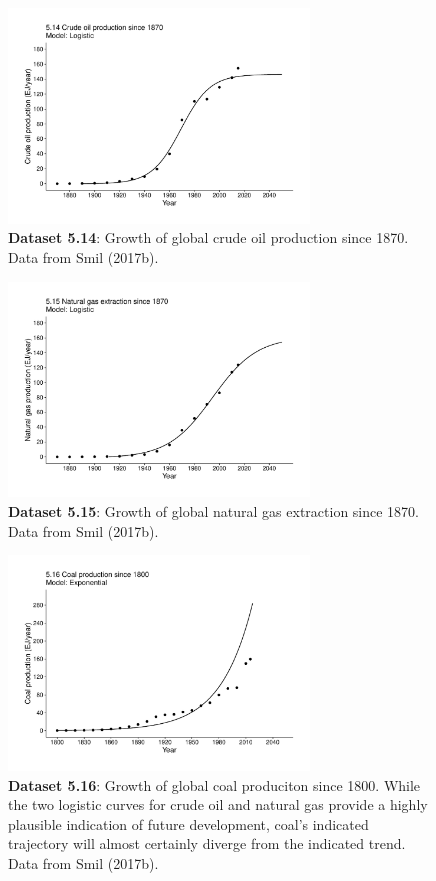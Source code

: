 \documentclass[aps,rmp,preprint,superscriptaddress,10pt,onecolumn]{article}
\begin{document}
\begin{figure}[h]
\includegraphics[width=8cm]{output/figs-ggplot/5.14.pdf}
\caption{\textbf{Dataset 5.14}: Growth of global crude oil production since 1870. Data from Smil (2017b).}
\end{figure}
	
\begin{figure}[h]
\includegraphics[width=8cm]{output/figs-ggplot/5.15.pdf}
\caption{\textbf{Dataset 5.15}: Growth of global natural gas extraction since 1870. Data from Smil (2017b).}
\end{figure}
	
\begin{figure}[h]
\includegraphics[width=8cm]{output/figs-ggplot/5.16.pdf}
\caption{\textbf{Dataset 5.16}: Growth of global coal produciton since 1800. While the two logistic curves for crude oil and natural gas provide a highly plausible indication of future development, coal's indicated trajectory will almost certainly diverge from the indicated trend. Data from Smil (2017b). }
\end{figure}
	
\end{document}
